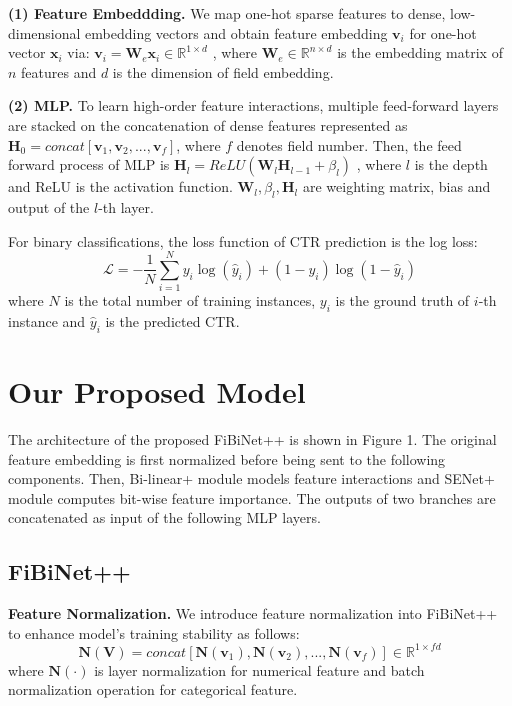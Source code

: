 \documentclass[sigconf]{acmart}
\begin{document}
\textbf{(1) Feature Embeddding.}
We map one-hot sparse features to dense, low-dimensional embedding vectors and obtain feature embedding $\mathbf{v}_i$ for one-hot vector $\mathbf{x}_i$ via:
$\mathbf{v}_i = \mathbf{W}_e\mathbf{x}_i\in\mathbb{R}^{1\times d}$
, where $\mathbf{W}_e \in\mathbb{R}^{n\times d}$ is the embedding matrix of $n$ features and $d$ is the dimension of field embedding.


\textbf{(2) MLP.}
To learn high-order feature interactions, multiple feed-forward layers are stacked on the concatenation of dense features represented as  $\mathbf{H}_0 = concat[\mathbf{v}_{1},\mathbf{v}_{2},...,\mathbf{v}_{f}]$, where $f$ denotes field number. Then, the feed forward process of MLP is 
$ \mathbf{H}_l = ReLU(\mathbf{W}_l\mathbf{H}_{l-1} + \beta_l)$ , where $l$ is the depth and ReLU is the activation function. $\mathbf{W}_l, \beta_l, \mathbf{H}_l$ are weighting matrix, bias and output of the $l$-th layer. 

For binary classifications, the loss function of CTR prediction is the log loss:
\begin{equation}
\mathcal{L} = -\frac{1}{N}\sum^N_{i=1}y_i\log(\hat{y}_i)+(1-y_i)\log(1-\hat{y}_i) 
\end{equation}
where $N$ is the total number of training instances, $y_i$ is the ground truth of $i$-th instance and $\hat{y}_i$ is the predicted CTR.  

\section{Our Proposed Model}
The architecture of the proposed FiBiNet++ is shown in Figure 1. The original feature embedding is first normalized before being sent to the following components. Then, Bi-linear+ module models feature interactions and SENet+ module computes bit-wise feature importance. The outputs of two branches are concatenated as input of the following MLP layers.
\subsection{FiBiNet++}

\textbf{Feature Normalization.}
We introduce feature normalization into FiBiNet++ to enhance model's training stability as follows:
\begin{equation}
  \mathbf{N}(\mathbf{V}) = concat[\mathbf{N}(\mathbf{v}_{1}),\mathbf{N}(\mathbf{v}_{2}),...,\mathbf{N}(\mathbf{v}_{f})]\in \mathbb{R}^{1\times fd}
\end{equation}
where  $\mathbf{N}\left(\cdot\right)$ is layer normalization\cite{ln2016} for numerical feature and batch normalization\cite{bn2015} operation for categorical feature.
\end{document}
